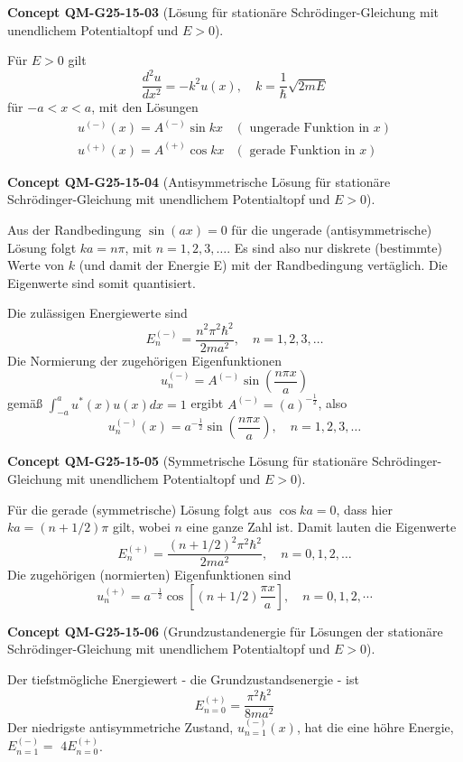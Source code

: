 \documentclass[10pt, letterpaper]{article}
\newcommand{\CustomHeading}[3]{%
  \par\medskip\noindent%
  \textbf{#1 #2} \textnormal{(#3)}.\enskip%
}
\newenvironment{CONC}[2]{\CustomHeading{Concept}{#1}{#2}}{}
\begin{document}
\begin{CONC}{QM-G25-15-03}{Lösung für stationäre Schrödinger-Gleichung mit unendlichem Potentialtopf und $E>0$}
Für $E>0$ gilt
$$
\frac{d^{2} u}{d x^{2}}=-k^{2} u(x), \quad k=\frac{1}{\hbar} \sqrt{2 m E}
$$
für $-a<x<a$, mit den Lösungen
$$
\begin{array}{ll}
u^{(-)}(x)=A^{(-)} \sin k x & (\text { ungerade Funktion in } x) \\
u^{(+)}(x)=A^{(+)} \cos k x & (\text { gerade Funktion in } x)
\end{array}
$$
\end{CONC}

\begin{CONC}{QM-G25-15-04}{Antisymmetrische Lösung für stationäre Schrödinger-Gleichung mit unendlichem Potentialtopf und $E>0$}
Aus der Randbedingung $\sin (a x)=0$ für die ungerade (antisymmetrische) Lösung folgt $k a=n \pi$, mit $n=1,2,3, \ldots$. Es sind also nur diskrete (bestimmte) Werte von $k$ (und damit der Energie E) mit der Randbedingung vertäglich. Die Eigenwerte sind somit quantisiert.

Die zulässigen Energiewerte sind
$$
E_{n}^{(-)}=\frac{n^{2} \pi^{2} \hbar^{2}}{2 m a^{2}}, \quad n=1,2,3, \ldots
$$
Die Normierung der zugehörigen Eigenfunktionen
$$
u_{n}^{(-)}=A^{(-)} \sin \left(\frac{n \pi x}{a}\right)
$$
gemäß $\int_{-a}^{a} u^{*}(x) u(x) d x=1$ ergibt $A^{(-)}=(a)^{-\frac{1}{2}}$, also
$$
u_{n}^{(-)}(x)=a^{-\frac{1}{2}} \sin \left(\frac{n \pi x}{a}\right), \quad n=1,2,3, \ldots
$$
\end{CONC}

\begin{CONC}{QM-G25-15-05}{Symmetrische Lösung für stationäre Schrödinger-Gleichung mit unendlichem Potentialtopf und $E>0$}
Für die gerade (symmetrische) Lösung folgt aus $\cos k a=0$, dass hier $k a=(n+1 / 2) \pi$ gilt, wobei $n$ eine ganze Zahl ist. Damit lauten die Eigenwerte
$$
E_{n}^{(+)}=\frac{(n+1 / 2)^{2} \pi^{2} \hbar^{2}}{2 m a^{2}}, \quad n=0,1,2, \ldots
$$
Die zugehörigen (normierten) Eigenfunktionen sind
$$
u_{n}^{(+)}=a^{-\frac{1}{2}} \cos \left[(n+1 / 2) \frac{\pi x}{a}\right], \quad n=0,1,2, \cdots
$$
\end{CONC}

\begin{CONC}{QM-G25-15-06}{Grundzustandenergie für Lösungen der stationäre Schrödinger-Gleichung mit unendlichem Potentialtopf und $E>0$}
Der tiefstmögliche Energiewert - die Grundzustandsenergie - ist
$$
E_{n=0}^{(+)}=\frac{\pi^{2} \hbar^{2}}{8 m a^{2}}
$$
Der niedrigste antisymmetriche Zustand, $u_{n=1}^{(-)}(x)$, hat die eine höhre Energie, $E_{n=1}^{(-)}=$ $4 E_{n=0}^{(+)}$.
\end{CONC}
\end{document}
